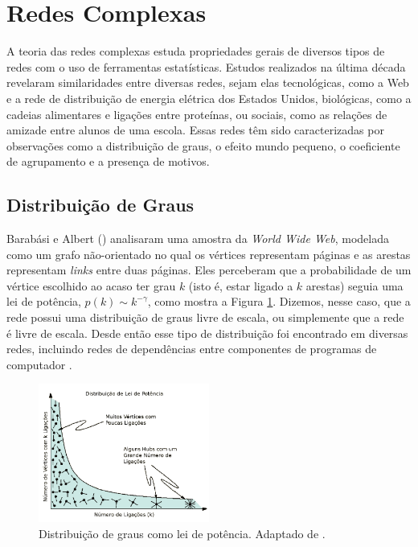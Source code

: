 \documentclass{article}
\begin{document}
\section{Redes Complexas}

A teoria das redes complexas estuda propriedades gerais de diversos tipos de redes com o uso de ferramentas estatísticas. Estudos realizados na última década revelaram similaridades entre diversas redes, sejam elas tecnológicas, como a Web e a rede de distribuição de energia elétrica dos Estados Unidos, biológicas, como a cadeias alimentares e ligações entre proteínas, ou sociais, como as relações de amizade entre alunos de uma escola. Essas redes têm sido caracterizadas por observações como a distribuição de graus, o efeito mundo pequeno, o coeficiente de agrupamento e a presença de motivos.

\subsection{Distribuição de Graus}

Barabási e Albert (\citeyear{Barabasi1999}) analisaram uma amostra da \textit{World Wide Web}, modelada como um grafo não-orientado no qual os vértices representam páginas e as arestas representam \textit{links} entre duas páginas. Eles perceberam que a probabilidade de um vértice escolhido ao acaso ter grau $k$ (isto é, estar ligado a $k$ arestas) seguia uma lei de potência, $p(k) \sim k^{-\gamma}$, como mostra a Figura \ref{fig:leidepotencia}. Dizemos, nesse caso, que a rede possui uma distribuição de graus livre de escala, ou simplemente que a rede é livre de escala. Desde então esse tipo de distribuição foi encontrado em diversas redes, incluindo redes de dependências entre componentes de programas de computador \cite{Valverde2003}.

\begin{figure} \label{fig:leidepotencia}
\centering
\includegraphics[width=0.5\textwidth]{leidepotencia}
\caption{Distribuição de graus como lei de potência. Adaptado de \cite{Barabasi2007}.}
\end{figure}
\end{document}
